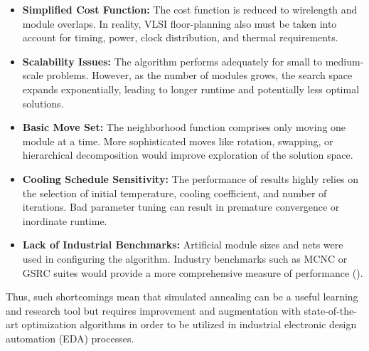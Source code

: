 \documentclass[9pt,a4paper,twoside]{rho-class/rho}
\begin{document}
\begin{itemize}
    \item \textbf{Simplified Cost Function:} The cost function is reduced to wirelength and module overlaps. In reality, VLSI floor-planning also must be taken into account for timing, power, clock distribution, and thermal requirements. 
    
    \item \textbf{Scalability Issues:} The algorithm performs adequately for small to medium-scale problems. However, as the number of modules grows, the search space expands exponentially, leading to longer runtime and potentially less optimal solutions.
    
    \item \textbf{Basic Move Set:} The neighborhood function comprises only moving one module at a time. More sophisticated moves like rotation, swapping, or hierarchical decomposition would improve exploration of the solution space. 

    \item \textbf{Cooling Schedule Sensitivity:} The performance of results highly relies on the selection of initial temperature, cooling coefficient, and number of iterations. Bad parameter tuning can result in premature convergence or inordinate runtime. 
    
    \item \textbf{Lack of Industrial Benchmarks:} Artificial module sizes and nets were used in configuring the algorithm. Industry benchmarks such as MCNC or GSRC suites would provide a more comprehensive measure of performance (\cite{sun2024}).
\end{itemize}

Thus, such shortcomings mean that simulated annealing can be a useful learning and research tool but requires improvement and augmentation with state-of-the-art optimization algorithms in order to be utilized in industrial electronic design automation (EDA) processes. 

\end{document}
